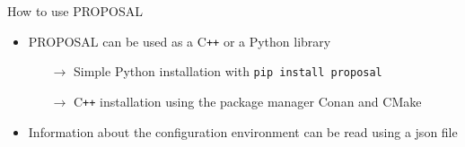 \documentclass[t]{beamer}
\newlength{\itemseparation}
\begin{document}
  \begin{columns}[onlytextwidth]%
    \begin{column}{0.55\textwidth}%
      \begin{block}[equal height group=F]{How to use PROPOSAL}%
        \begin{itemize}
          \setlength\itemsep{\itemseparation}
          \item PROPOSAL can be used as a C\texttt{++} or a Python library
            \begin{itemize}
              \setlength\itemsep{\itemseparation}
              \item[$\rightarrow$] Simple Python installation with \colorbox{tuYellow}{\texttt{pip install proposal}}
              \item[$\rightarrow$] C\texttt{++} installation using the package manager Conan and CMake
            \end{itemize}
          \item Information about the configuration environment can be read using a json file
        \end{itemize}
        \vspace{-0.75em}
        \begin{columns}[onlytextwidth]
        \begin{column}{0.48\textwidth}
        \begin{mdframed}[backgroundcolor=light-gray, roundcorner=10pt,leftmargin=1, rightmargin=1, innerleftmargin=15, innertopmargin=15,innerbottommargin=15, outerlinewidth=1, linecolor=light-gray]

          
          \end{mdframed} 


\end{column}
\end{columns}
\end{block}
\end{column}
\end{columns}
\end{document}
